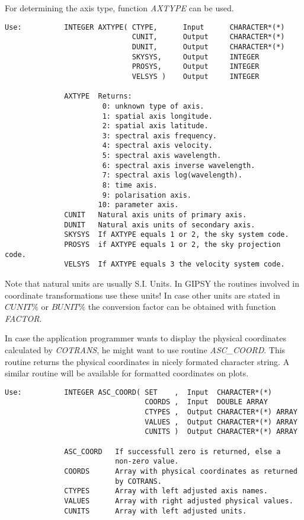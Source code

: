 For determining the axis type, function {\sl AXTYPE\/} can be used.

\begin{verbatim}
Use:          INTEGER AXTYPE( CTYPE,      Input      CHARACTER*(*)
                              CUNIT,      Output     CHARACTER*(*)
                              DUNIT,      Output     CHARACTER*(*)
                              SKYSYS,     Output     INTEGER
                              PROSYS,     Output     INTEGER
                              VELSYS )    Output     INTEGER

              AXTYPE  Returns:
                       0: unknown type of axis.
                       1: spatial axis longitude.
                       2: spatial axis latitude.
                       3: spectral axis frequency.
                       4: spectral axis velocity.
                       5: spectral axis wavelength.
                       6: spectral axis inverse wavelength.
                       7: spectral axis log(wavelength).
                       8: time axis.
                       9: polarisation axis.
                      10: parameter axis.
              CUNIT   Natural axis units of primary axis.
              DUNIT   Natural axis units of secondary axis.
              SKYSYS  If AXTYPE equals 1 or 2, the sky system code.
              PROSYS  if AXTYPE equals 1 or 2, the sky projection code.
              VELSYS  If AXTYPE equals 3 the velocity system code.
\end{verbatim}

Note that natural units  are usually S.I.  Units. 
In GIPSY the routines involved in coordinate transformations use these
units! In case other units are stated in $CUNIT\%$ or $BUNIT\%$ the
conversion factor can be obtained with function {\sl FACTOR\/}. 

In case the application programmer wants to display the physical
coordinates calculated by {\sl COTRANS\/}, he might want to use routine
{\sl ASC\_COORD\/}.  This routine returns the
physical coordinates in nicely formated character string.  A similar
routine will be available for formatted coordinates on plots. 

\begin{verbatim}
Use:          INTEGER ASC_COORD( SET    ,  Input  CHARACTER*(*)
                                 COORDS ,  Input  DOUBLE ARRAY
                                 CTYPES ,  Output CHARACTER*(*) ARRAY
                                 VALUES ,  Output CHARACTER*(*) ARRAY
                                 CUNITS )  Output CHARACTER*(*) ARRAY

              ASC_COORD   If successfull zero is returned, else a
                          non-zero value.
              COORDS      Array with physical coordinates as returned
                          by COTRANS.
              CTYPES      Array with left adjusted axis names.
              VALUES      Array with right adjusted physical values.
              CUNITS      Array with left adjusted units.
\end{verbatim}

